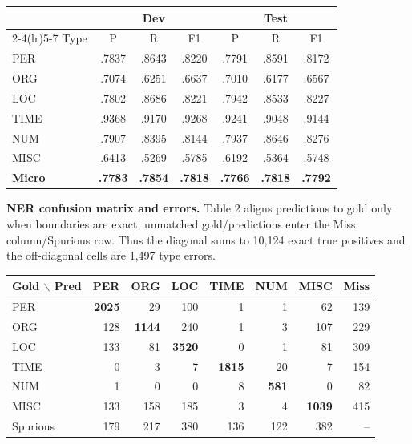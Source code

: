 \documentclass[10pt]{article}
\begin{document}
\begin{table}[H]\centering\scriptsize
\begin{tabular}{@{}l c c c c c c@{}}\toprule
& \multicolumn{3}{c}{Dev} & \multicolumn{3}{c}{Test} \\
\cmidrule(lr){2-4}\cmidrule(lr){5-7}
Type & P & R & F1 & P & R & F1 \\\midrule
PER  & .7837 & .8643 & .8220 & .7791 & .8591 & .8172 \\
ORG  & .7074 & .6251 & .6637 & .7010 & .6177 & .6567 \\
LOC  & .7802 & .8686 & .8221 & .7942 & .8533 & .8227 \\
TIME & .9368 & .9170 & .9268 & .9241 & .9048 & .9144 \\
NUM  & .7907 & .8395 & .8144 & .7937 & .8646 & .8276 \\
MISC & .6413 & .5269 & .5785 & .6192 & .5364 & .5748 \\\midrule
\textbf{Micro} & \textbf{.7783} & \textbf{.7854} & \textbf{.7818}
& \textbf{.7766} & \textbf{.7818} & \textbf{.7792} \\\bottomrule
\end{tabular}
\par{}
\end{table}\vspace{-0.65em}

\textbf{NER confusion matrix and errors.}
Table 2 aligns predictions to gold only when boundaries are exact; unmatched
gold/predictions enter the Miss column/Spurious row. Thus the diagonal sums to
10,124 exact true positives and the off-diagonal cells are 1,497 type errors.
\begin{table}[H]\centering\scriptsize
\begin{tabular}{@{}lrrrrrrr@{}}\toprule
Gold $\backslash$ Pred & PER & ORG & LOC & TIME & NUM & MISC & Miss \\\midrule
PER  & \textbf{2025} & 29 & 100 & 1 & 1 & 62 & 139 \\
ORG  & 128 & \textbf{1144} & 240 & 1 & 3 & 107 & 229 \\
LOC  & 133 & 81 & \textbf{3520} & 0 & 1 & 81 & 309 \\
TIME & 0 & 3 & 7 & \textbf{1815} & 20 & 7 & 154 \\
NUM  & 1 & 0 & 0 & 8 & \textbf{581} & 0 & 82 \\
MISC & 133 & 158 & 185 & 3 & 4 & \textbf{1039} & 415 \\\midrule
Spurious & 179 & 217 & 380 & 136 & 122 & 382 & -- \\\bottomrule
\end{tabular}
\par{}
\end{table}\vspace{-0.65em}
\end{document}
